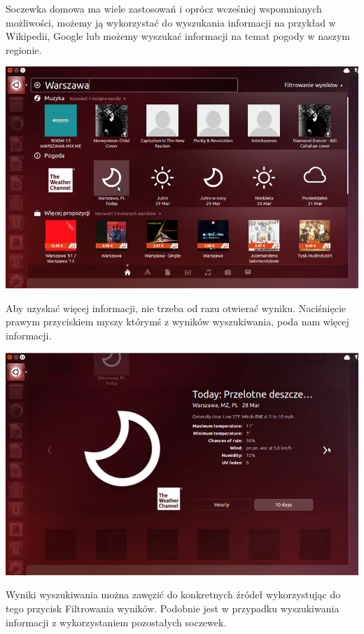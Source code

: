 Soczewka domowa ma wiele zastosowań i oprócz wcześniej wspomnianych możliwości, możemy ją wykorzystać do wyszukania informacji na przykład w Wikipedii, Google lub możemy wyszukać informacji na temat pogody w naszym regionie.
\clearpage
\begin{center}
	\includegraphics[width=\linewidth]{images/unity_dash_wyszukiwanie.png}
\end{center}

Aby uzyskać więcej informacji, nie trzeba od razu otwierać wyniku. Naciśnięcie prawym przyciskiem myszy którymś z wyników wyszukiwania, poda nam więcej informacji.

\begin{center}
	\includegraphics[width=\linewidth]{images/unity_dash_wyszukiwanie2.png}
\end{center}

Wyniki wyszukiwania można zawęzić do konkretnych źródeł wykorzystując do tego przycisk Filtrowania wyników. Podobnie jest w przypadku wyszukiwania informacji z wykorzystaniem pozostałych soczewek.

